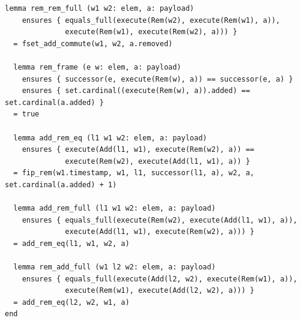 \begin{lstlisting}[caption={\texttt{RGA}}, label={lst:app_rga}]
  lemma rem_rem_full (w1 w2: elem, a: payload)
    ensures { equals_full(execute(Rem(w2), execute(Rem(w1), a)),
              execute(Rem(w1), execute(Rem(w2), a))) }
  = fset_add_commute(w1, w2, a.removed)

  lemma rem_frame (e w: elem, a: payload)
    ensures { successor(e, execute(Rem(w), a)) == successor(e, a) }
    ensures { set.cardinal((execute(Rem(w), a)).added) == set.cardinal(a.added) }
  = true

  lemma add_rem_eq (l1 w1 w2: elem, a: payload)
    ensures { execute(Add(l1, w1), execute(Rem(w2), a)) ==
              execute(Rem(w2), execute(Add(l1, w1), a)) }
  = fip_rem(w1.timestamp, w1, l1, successor(l1, a), w2, a, set.cardinal(a.added) + 1)

  lemma add_rem_full (l1 w1 w2: elem, a: payload)
    ensures { equals_full(execute(Rem(w2), execute(Add(l1, w1), a)),
              execute(Add(l1, w1), execute(Rem(w2), a))) }
  = add_rem_eq(l1, w1, w2, a)

  lemma rem_add_full (w1 l2 w2: elem, a: payload)
    ensures { equals_full(execute(Add(l2, w2), execute(Rem(w1), a)),
              execute(Rem(w1), execute(Add(l2, w2), a))) }
  = add_rem_eq(l2, w2, w1, a)
end
\end{lstlisting}
